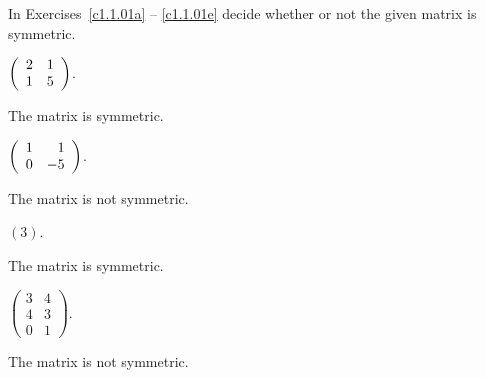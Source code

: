 \documentclass{ximera}
\begin{document}
\TEXER

\noindent In Exercises~\ref{c1.1.01a} -- \ref{c1.1.01e} decide whether or
not the given matrix is symmetric.
\begin{exercise} \label{c1.1.01a}
  $\left(\begin{array}{rr} 2 & 1\\ 1 &5\end{array}\right)$.
  \begin{multipleChoice}
  \end{multipleChoice}

\begin{solution}
The matrix is symmetric.

\end{solution}
\end{exercise}

\begin{exercise} \label{c1.1.01b}
  $\left(\begin{array}{rr} 1 & 1\\ 0 &-5\end{array}\right)$.
  \begin{multipleChoice}
  \end{multipleChoice}  

\begin{solution}
The matrix is not symmetric.

\end{solution}
\end{exercise}

\begin{exercise} \label{c1.1.01c}
  $(3)$.
  \begin{multipleChoice}
  \end{multipleChoice}  

\begin{solution}
The matrix is symmetric.

\end{solution}
\end{exercise}

\begin{exercise} \label{c1.1.01d}
  $\left( \begin{array}{rr}
            3 & 4 \\
            4 & 3 \\
            0 & 1 \end{array} \right)$.
  \begin{multipleChoice}
  \end{multipleChoice}          

\begin{solution}
The matrix is not symmetric.

\end{solution}
\end{exercise}
\end{document}
